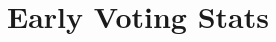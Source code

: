 \documentclass{article}
\begin{document}

\title{Early Voting Stats}
\maketitle

\begin{center}
  
\end{center}  
\end{document}
